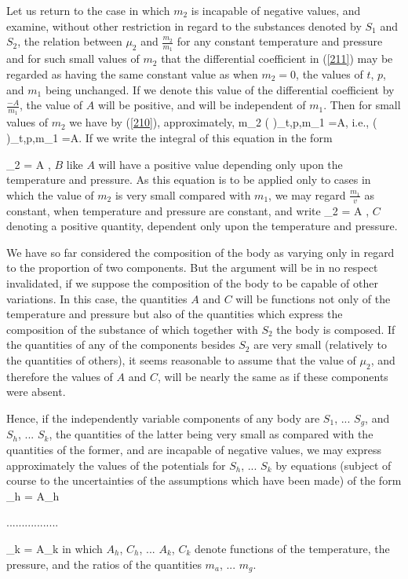 \documentclass[12pt]{article}
\begin{document}
Let us return to the case in which $m_2$ is incapable of negative values, and examine, without other restriction in regard to the substances denoted by $S_1$ and $S_2$, the relation between $\mu_2$ and $\frac{m_2}{m_1}$ for any constant temperature and pressure and for such small values of $m_2$ that the differential coefficient in (\ref{211}) may be regarded as having the same constant value as when $m_2=0$, the values of $t$, $p$, and $m_1$ being unchanged. If we denote this value of the differential coefficient by
$\frac{-A}{m_1}$, the value of $A$ will be positive, and will be independent of $m_1$. Then for small values of $m_2$ we have by (\ref{210}), approximately,
\eqs m_2 \left(  \right)_{t,p,m_1}   =A,  \label{213}\eqe
i.e.,     
\eqs \left(  \right)_{t,p,m_1}   =A.  \label{214}\eqe
If we write the integral of this equation in the form

\eqs \mu_2 = A \log {},   \label{215}\eqe
$B$ like $A$ will have a positive value depending only upon the temperature and pressure. As this equation is to be applied only to cases in which the value of $m_2$ is very small compared with $m_1$, we may
regard $\frac{m_1}{v}$ as constant, when temperature and pressure are constant, and write 
\eqs \mu_2 = A \log {},   \label{216}\eqe
$C$ denoting a positive quantity, dependent only upon the temperature and pressure.


We have so far considered the composition of the body as varying only in regard to the proportion of two components. But the argument will be in no respect invalidated, if we suppose the composition of the body to be capable of other variations. In this case, the quantities $A$ and $C$ will be functions not only of the temperature and pressure but also of the quantities which express the composition of the substance of which together with $S_2$ the body is composed. If the quantities of any of the components besides $S_2$ are very small (relatively to the quantities of others), it seems reasonable to assume that the value of $\mu_2$, and therefore the values of $A$ and $C$, will be nearly the same as if these components were absent.


Hence, if the independently variable components of any body are $S_1$, ... $S_g$, and $S_h$, ... $S_k$, the quantities of the latter being very small as compared with the quantities of the former, and are incapable of negative values, we may express approximately the values of the potentials for $S_h$, ... $S_k$ by equations (subject of course to the uncertainties of the assumptions which have been made) of the form
\eqs \mu_h = A_h \log {}    \label{217}\eqe
\begin{center}................. \end{center}
\eqs \mu_k = A_k \log {}  \label{218}\eqe
in which $A_h$, $C_h$, ... $A_k$, $C_k$ denote functions of the temperature, the pressure, and the ratios of the quantities $m_a$, ... $m_g$.
\end{document}

